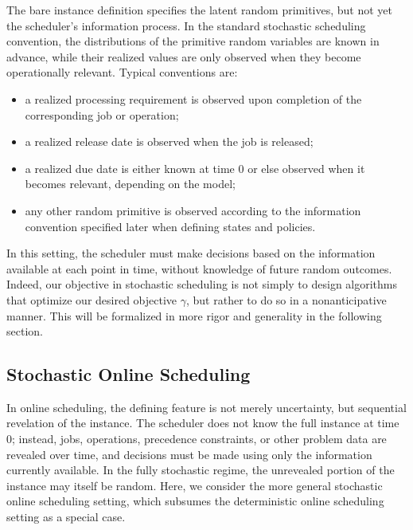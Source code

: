 \begin{remark}
The bare instance definition specifies the latent random primitives, but not yet the scheduler's information process. In the standard stochastic scheduling convention, the distributions of the primitive random variables are known in advance, while their realized values are only observed when they become operationally relevant. Typical conventions are:
\begin{itemize}
    \item a realized processing requirement is observed upon completion of the corresponding job or operation;
    \item a realized release date is observed when the job is released;
    \item a realized due date is either known at time \(0\) or else observed when it becomes relevant, depending on the model;
    \item any other random primitive is observed according to the information convention specified later when defining states and policies.
\end{itemize}
\end{remark}


In this setting, the scheduler must make decisions based on the information available at each point in time, without knowledge of future random outcomes. Indeed, our objective in stochastic scheduling is not simply to design algorithms that optimize our desired objective $\gamma$, but rather to do so in a nonanticipative manner. This will be formalized in more rigor and generality in the following section.

\subsection{Stochastic Online Scheduling}

In online scheduling, the defining feature is not merely uncertainty, but sequential revelation of the instance. The scheduler does not know the full instance at time \(0\); instead, jobs, operations, precedence constraints, or other problem data are revealed over time, and decisions must be made using only the information currently available. In the fully stochastic regime, the unrevealed portion of the instance may itself be random. Here, we consider the more general stochastic online scheduling setting, which subsumes the deterministic online scheduling setting as a special case.


